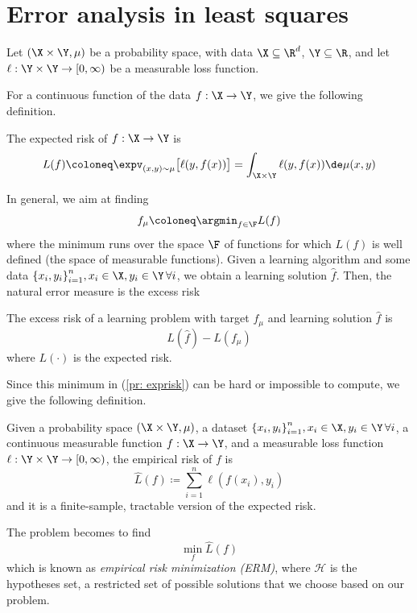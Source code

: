 \section{Error analysis in least squares}


Let $(\X \times \Y, \mu)$ be a probability space, with data $\X \subseteq \R^d$, $\Y\subseteq\R$, and let $\ell:\Y\times\Y \to [0,\infty)$ be a measurable loss function.

For a continuous function of the data $f:\X\to\Y$, we give the following definition. 

\begin{definition}
The expected risk of $f:\X\to\Y$ is 
\begin{equation}
    L(f) \coloneq \expv_{(x,y)\sim\mu} \big[\ell(y,f(x))\big] = \int_{\X\times\Y} \ell(y,f(x)) \de \mu(x,y)
\end{equation}
\end{definition}

In general, we aim at finding \begin{equation}\label{pr: exprisk}f_\mu \coloneq \argmin_{f\in\F} L(f)\end{equation}
where the minimum runs over the space $\F$ of functions for which $L(f)$ is well defined (the space of measurable functions). Given a learning algorithm and some data ${\{x_i,y_i\}}_{i=1}^n, x_i \in \X, y_i \in \Y \,\forall i$, we obtain a learning solution $\hat f$. Then, the natural error measure is the excess risk
\begin{definition}
    The excess risk of a learning problem with target $f_\mu$ and learning solution $\hat f$ is
    \[ L(\hat f) - L(f_\mu)\]
    where $L(\cdot)$ is the expected risk.
\end{definition}

Since this minimum in (\ref{pr: exprisk}) can be hard or impossible to compute, we give the following definition. 

\begin{definition}
    Given a probability space $(\X \times \Y, \mu)$, a dataset ${\{x_i,y_i\}}_{i=1}^n, x_i \in \X, y_i \in \Y \,\forall i$, a continuous measurable function $f:\X\to\Y$, and a measurable loss function $\ell:\Y\times\Y \to [0,\infty)$, the empirical risk of $f$ is
    \begin{equation}\label{eq: emprisk}
        \hat L(f) \coloneq \sum_{i=1}^n \ell(f(x_i), y_i)
    \end{equation}
    and it is a finite-sample, tractable version of the expected risk. 
\end{definition}
The problem becomes to find \begin{equation} \min_{f} \hat L(f)\end{equation}
which is known as {\it empirical risk minimization (ERM)},
where $\mathcal{H}$ is the hypotheses set, a restricted set of possible solutions that we choose based on our problem. 
\\

